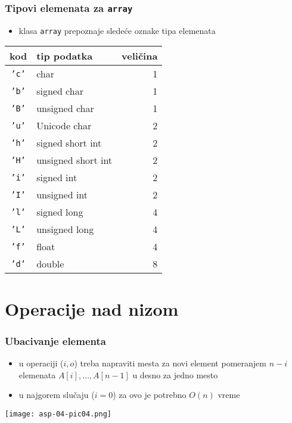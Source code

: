 \documentclass[compress]{beamer}
\begin{document}
\begin{frame}[fragile]
  \frametitle{Tipovi elemenata za \texttt{array}}
  \begin{itemize}
    \item klasa \texttt{array} prepoznaje sledeće oznake tipa elemenata
  \end{itemize}
\begin{center}
\begin{tabular}{clr}
\textbf{kod} & \textbf{tip podatka} & \textbf{veličina} \\
\hline \hline 
\texttt{'c'} & char & 1 \\ \hline 
\texttt{'b'} & signed char & 1 \\ \hline 
\texttt{'B'} & unsigned char & 1 \\ \hline
\texttt{'u'} & Unicode char & 2 \\ \hline
\texttt{'h'} & signed short int & 2 \\ \hline
\texttt{'H'} & unsigned short int & 2 \\ \hline
\texttt{'i'} & signed int & 2 \\ \hline
\texttt{'I'} & unsigned int & 2 \\ \hline
\texttt{'l'} & signed long & 4 \\ \hline
\texttt{'L'} & unsigned long & 4 \\ \hline
\texttt{'f'} & float & 4 \\ \hline
\texttt{'d'} & double & 8 \\ \hline
\end{tabular}
\end{center}
\end{frame}

\section[Operacije]{Operacije nad nizom}
\begin{frame}[fragile]
  \frametitle{Ubacivanje elementa}
  \begin{itemize}
    \item u operaciji ($i, o$) treba napraviti mesta za novi element
    pomeranjem $n-i$ elemenata $A[i], \ldots, A[n-1]$ u desno za jedno mesto
    \item u najgorem slučaju ($i = 0$) za ovo je potrebno $O(n)$ vreme
  \end{itemize}
  \begin{center}
    \texttt{[image: asp-04-pic04.png]}
  \end{center}
\end{frame}
\end{document}
